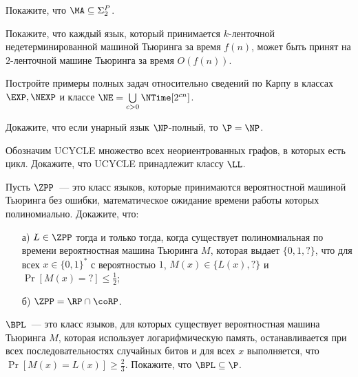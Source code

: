 \begin{task}
    Покажите, что $\MA \subseteq \Sigma_2^P$.
\end{task}




\breakline

\begin{ptask}{8}
    Покажите, что каждый язык, который принимается $k$-ленточной недетерминированной машиной Тьюринга за время $f(n)$, может быть
    принят на $2$-ленточной машине Тьюринга за время $O(f(n))$.
\end{ptask}



\begin{ptask}{35}
	Постройте примеры полных задач относительно сведений по Карпу в классах $\EXP, \NEXP$ и классе $\NE = \bigcup\limits_{c > 0}
    \NTime[2^{cn}]$.
\end{ptask}


\begin{ptask}{41}
    Докажите, что если унарный язык $\NP$-полный, то $\P = \NP$.
\end{ptask}

\begin{ptask}{42}
	Обозначим UCYCLE множество всех неориентрованных графов, в которых есть цикл. Докажите, что UCYCLE принадлежит классу $\LL$. 
\end{ptask}

\begin{ptask}{44}
    Пусть $\ZPP$~--- это класс языков, которые принимаются вероятностной машиной Тьюринга без ошибки, математическое ожидание
    времени работы которых полиномиально. Докажите, что:
    \begin{enumerate}[topsep = 0pt, itemsep = -1ex]
        \item [а)] $L \in \ZPP$ тогда и только тогда, когда существует полиномиальная по времени вероятностная машина Тьюринга
			$M$, которая выдает $\{0, 1, ?\}$, что для всех $x \in \{0, 1\}^*$ с вероятностью $1$, $M(x) \in \{L(x), ?\}$ и 
            $\Pr[M(x) = {?}] \le \frac{1}{2}$;
        \item [б)] $\ZPP = \RP \cap \coRP$.
    \end{enumerate}
\end{ptask}

\begin{ptask}{45}
    $\BPL$~--- это класс языков, для которых существует вероятностная машина Тьюринга $M$, которая использует логарифмическую
    память, останавливается при всех последовательностях случайных битов и для всех $x$ выполняется, что $\Pr[M(x) = L(x)] \ge
    \frac{2}{3}$. Покажите, что $\BPL \subseteq \P$. 
\end{ptask}
